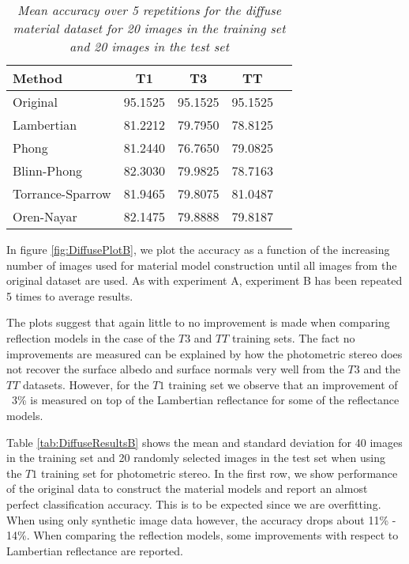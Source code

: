 \begin{table}
	\center
	\begin{tabular}{l|c|c|c|r}
	Method 				&	T1  	&	T3 		&	TT	\\
	\hline
	Original			&	95.1525	&	95.1525 &	95.1525	\\
	Lambertian 			&	81.2212	&	79.7950	&	78.8125	\\
	Phong 				&	81.2440	&	76.7650 &	79.0825	\\
	Blinn-Phong 		& 	82.3030 &	79.9825 &	78.7163	\\
	Torrance-Sparrow 	&	81.9465 &	79.8075 &	81.0487	\\
	Oren-Nayar 			&	82.1475 &	79.8888 &	79.8187	\\
	\end{tabular}
	\caption{{\it Mean accuracy over 5 repetitions for the diffuse material dataset for 20 images in the training set and 20 images in the test set}}
	\label{tab:DiffuseResultsA}
\end{table}

In figure \ref{fig:DiffusePlotB}, we plot the accuracy as a function of the increasing number of images used for material model construction until all images from the original dataset are used. As with experiment A, experiment B has been repeated 5 times to average results. 

The plots suggest that again little to no improvement is made when comparing reflection models in the case of the $T3$ and $TT$ training sets. The fact no improvements are measured can be explained by how the photometric stereo does not recover the surface albedo and surface normals very well from the $T3$ and the $TT$ datasets. However, for the $T1$ training set we observe that an improvement of ~3\% is measured on top of the Lambertian reflectance for some of the reflectance models. 

Table \ref{tab:DiffuseResultsB} shows the mean and standard deviation for 40 images in the training set and 20 randomly selected images in the test set when using the $T1$ training set for photometric stereo. In the first row, we show performance of the original data to construct the material models and report an almost perfect classification accuracy. This is to be expected since we are overfitting. When using only synthetic image data however, the accuracy drops about 11\% - 14\%. When comparing the reflection models, some improvements with respect to Lambertian reflectance are reported. 

